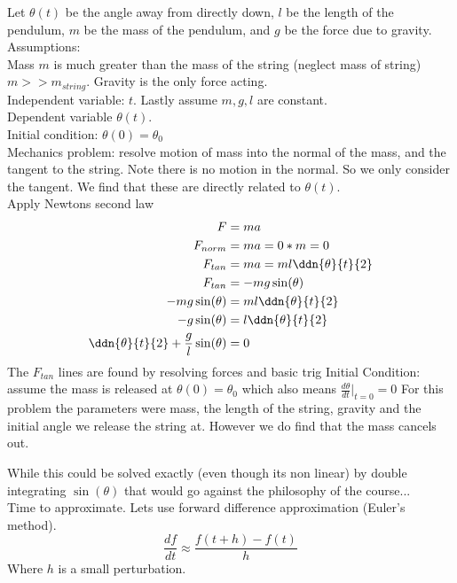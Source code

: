 \documentclass{X:/Documents/Coding/Latex/myassignment}
\begin{document}
Let $\theta(t)$ be the angle away from directly down, $l$ be the length of the pendulum, $m$ be the mass of the pendulum, and $g$ be the force due to gravity.\\
Assumptions:\\
Mass $m$ is much greater than the mass of the string (neglect mass of string) $m >> m_{string}$. Gravity is the only force acting.\\
Independent variable: $t$. Lastly assume $m,g,l$ are constant.\\
Dependent variable $\theta(t)$.\\
Initial condition: $\theta(0) = \theta_0$\\
Mechanics problem: resolve motion of mass into the normal of the mass, and the tangent to the string. Note there is no motion in the normal. So we only consider the tangent. We find that these are directly related to $\theta(t)$. \\
Apply Newtons second law
\begin{align*}
    F&=ma\\
    F_{norm}&= ma = 0*m = 0\\
    F_{tan}&= ma=ml\ddn{\theta}{t}{2}\\
    F_{tan} &=-mg \sin(\theta)\\
    -mg\sin(\theta) &= ml\ddn{\theta}{t}{2}\\
    -g\sin(\theta) &= l \ddn{\theta}{t}{2}\\
    \ddn{\theta}{t}{2} + \frac{g}{l} \sin(\theta)&= 0
\end{align*}
The $F_{tan}$ lines are found by resolving forces and basic trig
Initial Condition: assume the mass is released at $\theta(0) = \theta_0$ which also means $\frac{d\theta}{dt}|_{t=0} = 0$ 
For this problem the parameters were mass, the length of the string, gravity and the initial angle we release the string at. However we do find that the mass cancels out.

While this could be solved exactly (even though its non linear) by double integrating $\sin(\theta)$ that would go against the philosophy of the course...\\
Time to approximate. Lets use forward difference approximation (Euler's method).
\[\frac{df}{dt} \approx \frac{f(t+h) - f(t)}{h}\]
Where $h$ is a small perturbation.
\end{document}
